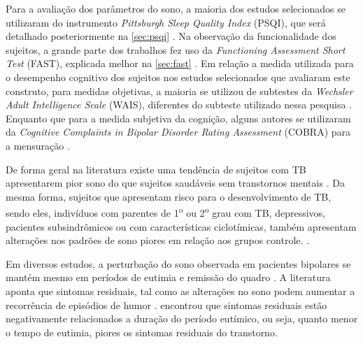 \documentclass[chapter=TITLE,
               oneside,
               12pt,
               a4paper,
               english,
               brazil]{abntex2}    %
\begin{document}
        Para a avaliação dos parâmetros do sono, a maioria dos estudos selecionados
        se utilizaram do instrumento \textit{Pittsburgh Sleep Quality Index} (PSQI),
        que será detalhado posteriormente na \autoref{sec:psqi}
        \parencite{buysse_pittsburgh_1989}.
        Na observação da funcionalidade dos sujeitos, a grande parte dos trabalhos
        fez uso da \textit{Functioning Assessment Short Test} (FAST), explicada
        melhor na \autoref{sec:fast}
        \parencite{rosa_validity_2007}.
        Em relação a medida utilizada para o desempenho cognitivo dos sujeitos nos
        estudos selecionados que avaliaram este construto, para medidas objetivas,
        a maioria se utilizou de subtestes da
        \textit{Wechsler Adult Intelligence Scale} (WAIS),
        diferentes do subteste utilizado nessa pesquisa
        \parencite{wechsler_wais_2004}.
        Enquanto que para a medida subjetiva da cognição, alguns autores 
        se utilizaram da
        \textit{Cognitive Complaints in Bipolar Disorder Rating Assessment} (COBRA)
        para a mensuração
        \parencite{luo_subjective_2020,
        lin_associations_2019}.

        De forma geral na literatura existe uma tendência de sujeitos com TB
        apresentarem pior sono do que sujeitos saudáveis sem transtornos mentais
        \parencite{boland_associations_2015,
        russo_relationship_2015,
        lai_familiality_2014,
        bradley_sleep_2017,
        st-amand_sleep_2013}.
        Da mesma forma, sujeitos que apresentam risco para o desenvolvimento de TB,
        sendo eles, indivíduos com parentes de
        1\textsuperscript{o} ou 2\textsuperscript{o}
        grau com TB, depressivos, pacientes subsindrômicos ou com características
        ciclotímicas, também apresentam alterações nos padrões de
        sono piores em relação aos grupos controle.
        \parencite{zanini_abnormalities_2015,
        ritter_characteristics_2012}.

        Em diversos estudos, a perturbação do sono observada em pacientes bipolares
        se mantém mesmo em períodos de eutimia e remissão do quadro
        \parencite{geoffroy_comment_2017,
        karthick_quality_2015,
        de_la_fuente-tomas_sleep_2018}.
        A literatura aponta que sintomas residuais, tal como as alterações no
        sono podem aumentar a recorrência de episódios de humor
        \parencite{sylvia_sleep_2012,
        kaplan_hypersomnia_2015}.
        \textcite{samalin_course_2016} encontrou que sintomas residuais estão
        negativamente relacionados a duração do período eutímico, ou seja,
        quanto menor o tempo de eutimia, piores os sintomas residuais do
        transtorno.
\end{document}
